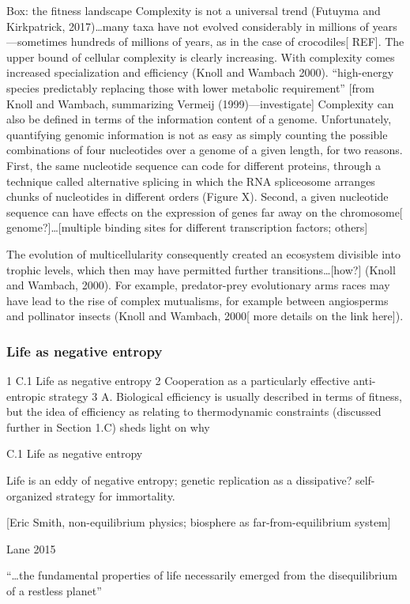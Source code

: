 \documentclass{tufte-book} %
\begin{document}
Box: the fitness landscape
Complexity is not a universal trend (Futuyma and Kirkpatrick, 2017)…many taxa have not evolved considerably in millions of years—sometimes hundreds of millions of years, as in the case of crocodiles[ REF].
The upper bound of cellular complexity is clearly increasing. With complexity comes increased specialization and efficiency (Knoll and Wambach 2000). 
“high-energy species predictably replacing those with lower metabolic requirement” [from Knoll and Wambach, summarizing Vermeij (1999)—investigate]
Complexity can also be defined in terms of the information content of a genome. Unfortunately, quantifying genomic information is not as easy as simply counting the possible combinations of four nucleotides over a genome of a given length, for two reasons. First, the same nucleotide sequence can code for different proteins, through a technique called alternative splicing in which the RNA spliceosome arranges chunks of nucleotides in different orders (Figure X). Second, a given nucleotide sequence can have effects on the expression of genes far away on the chromosome[ genome?]…[multiple binding sites for different transcription factors; others]

The evolution of multicellularity consequently created an ecosystem divisible into trophic levels, which then may have permitted further transitions…[how?] (Knoll and Wambach, 2000). For example, predator-prey evolutionary arms races may have lead to the rise of complex mutualisms, for example between angiosperms and pollinator insects (Knoll and Wambach, 2000[ more details on the link here]). 
\subsubsection{Life as negative entropy}

	1	C.1	Life as negative entropy
	2	Cooperation as a particularly effective anti-entropic strategy 
	3	
	A.	Biological efficiency is usually described in terms of fitness, but the idea of efficiency as relating to thermodynamic constraints (discussed further in Section 1.C) sheds light on why

C.1 Life as negative entropy

Life is an eddy of negative entropy; genetic replication as a dissipative? self-organized strategy for immortality.

[Eric Smith, non-equilibrium physics; biosphere as far-from-equilibrium system]

Lane 2015

“…the fundamental properties of life necessarily emerged from the disequilibrium of a restless planet”
\end{document}
